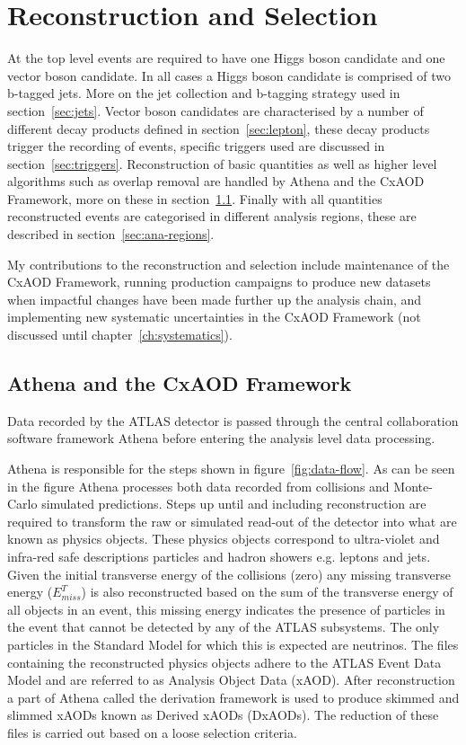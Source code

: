 \chapter{Reconstruction and Selection}%
\label{ch:recon}

At the top level events are required to have one Higgs boson candidate and one
vector boson candidate. In all cases a Higgs boson candidate is comprised of two
b-tagged jets. More on the jet collection and b-tagging strategy used in
section~\ref{sec:jets}. Vector boson candidates are characterised by a number of
different decay products defined in section~\ref{sec:lepton}, these decay
products trigger the recording of events, specific triggers used are discussed
in section~\ref{sec:triggers}. Reconstruction of basic quantities as well as
higher level algorithms such as overlap removal are handled by Athena and the
CxAOD Framework, more on these in section~\ref{sec:cxaod}. Finally with all
quantities reconstructed events are categorised in different analysis regions,
these are described in section~\ref{sec:ana-regions}.

My contributions to the reconstruction and selection include maintenance of the
CxAOD Framework, running production campaigns to produce new datasets when
impactful changes have been made further up the analysis chain, and implementing
new systematic uncertainties in the CxAOD Framework (not discussed until
chapter~\ref{ch:systematics}).

\section{Athena and the CxAOD Framework}
\label{sec:cxaod}
Data recorded by the ATLAS detector is passed through the central collaboration
software framework Athena before entering the analysis level data processing.

Athena is responsible for the steps shown in figure~\ref{fig:data-flow}. As can
be seen in the figure Athena processes both data recorded from collisions and
Monte-Carlo simulated predictions. Steps up until and including reconstruction
are required to transform the raw or simulated read-out of the detector into
what are known as physics objects. These physics objects correspond to
ultra-violet and infra-red safe descriptions particles and hadron showers e.g.
leptons and jets. Given the initial transverse energy of the collisions (zero)
any missing transverse energy ($E^T_{miss}$) is also reconstructed based on the
sum of the transverse energy of all objects in an event, this missing energy
indicates the presence of particles in the event that cannot be detected by any
of the ATLAS subsystems. The only particles in the Standard Model for which this
is expected are neutrinos. The files containing the reconstructed physics objects
adhere to the ATLAS Event Data Model and are referred to as Analysis Object Data
(xAOD). After reconstruction a part of Athena called the derivation framework is
used to produce skimmed and slimmed xAODs known as Derived xAODs (DxAODs). The
reduction of these files is carried out based on a loose selection criteria.

